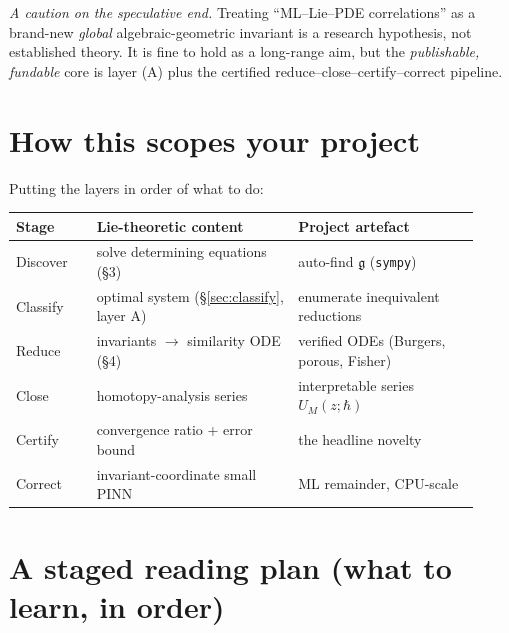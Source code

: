 \documentclass[11pt]{article}
\theoremstyle{definition}
\theoremstyle{remark}
\newcommand{\g}{\mathfrak{g}}
\begin{document}
\noindent\emph{A caution on the speculative end.} Treating ``ML--Lie--PDE correlations'' as a brand-new
\emph{global} algebraic-geometric invariant is a research hypothesis, not established theory. It is fine
to hold as a long-range aim, but the \emph{publishable, fundable} core is layer (A) plus the certified
reduce--close--certify--correct pipeline.

\section{How this scopes your project}

Putting the layers in order of what to do:
\begin{center}
\begin{tabular}{p{0.16\linewidth} p{0.40\linewidth} p{0.36\linewidth}}
\hline
\textbf{Stage} & \textbf{Lie-theoretic content} & \textbf{Project artefact} \\ \hline
Discover & solve determining equations (\S3) & auto-find $\g$ (\texttt{sympy}) \\
Classify & optimal system (\S\ref{sec:classify}, layer A) & enumerate inequivalent reductions \\
Reduce & invariants $\to$ similarity ODE (\S4) & verified ODEs (Burgers, porous, Fisher) \\
Close & homotopy-analysis series & interpretable series $U_M(z;\hbar)$ \\
Certify & convergence ratio + error bound & the headline novelty \\
Correct & invariant-coordinate small PINN & ML remainder, CPU-scale \\ \hline
\end{tabular}
\end{center}

\section{A staged reading plan (what to learn, in order)}
\end{document}
